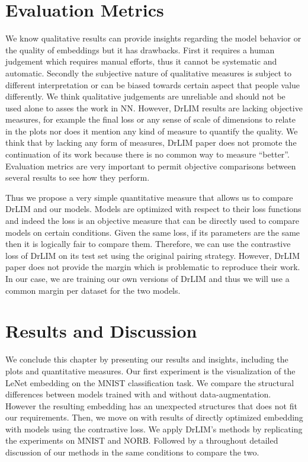 \documentclass[a4paper,12pt]{report}
\begin{document}
\section{Evaluation Metrics}
We know qualitative results can provide insights regarding the model behavior or the quality of embeddings but it has drawbacks.
First it requires a human judgement which requires manual efforts, thus it cannot be systematic and automatic.
Secondly the subjective nature of qualitative measures is subject to different interpretation or can be biased towards certain aspect that people value differently.
We think qualitative judgements are unreliable and should not be used alone to asses the work in NN.
However, DrLIM results are lacking objective measures, for example the final loss or any sense of scale of dimensions to relate in the plots nor does it mention any kind of measure to quantify the quality.
We think that by lacking any form of measures, DrLIM paper does not promote the continuation of its work because there is no common way to measure ``better''.
Evaluation metrics are very important to permit objective comparisons between several results to see how they perform.

Thus we propose a very simple quantitative measure that allows us to compare DrLIM and our models.
Models are optimized with respect to their loss functions and indeed the loss is an objective measure that can be directly used to compare models on certain conditions.
Given the same loss, if its parameters are the same then it is logically fair to compare them.
Therefore, we can use the contrastive loss of DrLIM on its test set using the original pairing strategy.
However, DrLIM paper does not provide the margin which is problematic to reproduce their work.
In our case, we are training our own versions of DrLIM and thus we will use a common margin per dataset for the two models.

\section{Results and Discussion}

We conclude this chapter by presenting our results and insights, including the plots and quantitative measures.
Our first experiment is the visualization of the LeNet embedding on the MNIST classification task.
We compare the structural differences between models trained with and without data-augmentation.
However the resulting embedding has an unexpected structures that does not fit our requirements.
Then, we move on with results of directly optimized embedding with models using the contrastive loss.
We apply DrLIM's methods by replicating the experiments on MNIST and NORB.
Followed by a throughout detailed discussion of our methods in the same conditions to compare the two.
\end{document}

